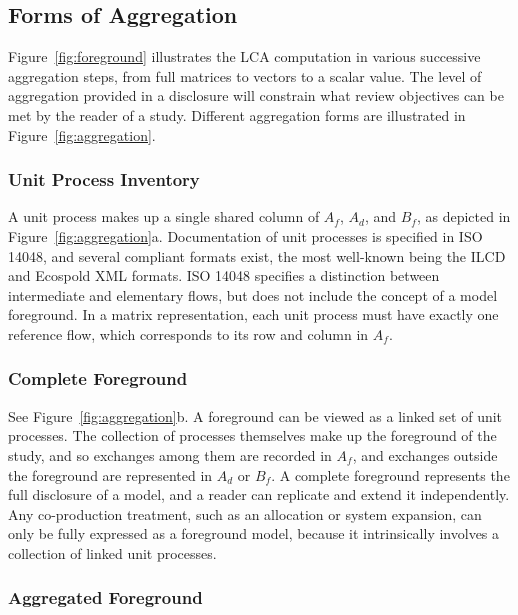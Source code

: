 \subsection{Forms of Aggregation}

Figure~\ref{fig:foreground} illustrates the LCA computation in various successive aggregation steps, from full matrices to vectors to a scalar value.  The level of aggregation provided in a disclosure will constrain what review objectives can be met by the reader of a study.  Different aggregation forms are illustrated in Figure~\ref{fig:aggregation}.

\subsubsection{Unit Process Inventory}

A unit process makes up a single shared column of $A_f$, $A_d$, and $B_f$, as depicted in Figure~\ref{fig:aggregation}a.  Documentation of unit processes is specified in ISO 14048, and several compliant formats exist, the most well-known being the ILCD and Ecospold XML formats.  ISO 14048 specifies a distinction between intermediate and elementary flows, but does not include the concept of a model foreground.  In a matrix representation, each unit process must have exactly one reference flow, which corresponds to its row and column in $A_f$.



\subsubsection{Complete Foreground}

See Figure~\ref{fig:aggregation}b.  A foreground can be viewed as a linked set of unit processes.  The collection of processes themselves make up the foreground of the study, and so exchanges among them are recorded in $A_f$, and exchanges outside the foreground are represented in $A_d$ or $B_f$.  A complete foreground represents the full disclosure of a model, and a reader can replicate and extend it independently.  Any co-production treatment, such as an allocation or system expansion, can only be fully expressed as a foreground model, because it intrinsically involves a collection of linked unit processes.

\subsubsection{Aggregated Foreground}

